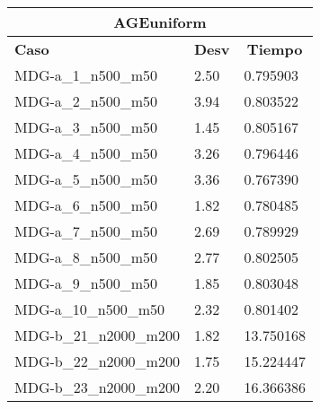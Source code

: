\documentclass[10pt,a4paper]{article}
\begin{document}
\begin{table}[]
	\centering
	\begin{tabular}{lll}
		\hline
		\multicolumn{3}{|c|}{\textbf{AGEuniform}}                                                                                \\ \hline
		\multicolumn{1}{|l|}{\textbf{Caso}}          & \multicolumn{1}{c|}{\textbf{Desv}} & \multicolumn{1}{c|}{\textbf{Tiempo}} \\ \hline
		\multicolumn{1}{|l|}{MDG-a\_1\_n500\_m50}    & \multicolumn{1}{l|}{2.50}          & \multicolumn{1}{l|}{0.795903}        \\ \hline
		\multicolumn{1}{|l|}{MDG-a\_2\_n500\_m50}    & \multicolumn{1}{l|}{3.94}          & \multicolumn{1}{l|}{0.803522}        \\ \hline
		\multicolumn{1}{|l|}{MDG-a\_3\_n500\_m50}    & \multicolumn{1}{l|}{1.45}          & \multicolumn{1}{l|}{0.805167}        \\ \hline
		\multicolumn{1}{|l|}{MDG-a\_4\_n500\_m50}    & \multicolumn{1}{l|}{3.26}          & \multicolumn{1}{l|}{0.796446}        \\ \hline
		\multicolumn{1}{|l|}{MDG-a\_5\_n500\_m50}    & \multicolumn{1}{l|}{3.36}          & \multicolumn{1}{l|}{0.767390}        \\ \hline
		\multicolumn{1}{|l|}{MDG-a\_6\_n500\_m50}    & \multicolumn{1}{l|}{1.82}          & \multicolumn{1}{l|}{0.780485}        \\ \hline
		\multicolumn{1}{|l|}{MDG-a\_7\_n500\_m50}    & \multicolumn{1}{l|}{2.69}          & \multicolumn{1}{l|}{0.789929}        \\ \hline
		\multicolumn{1}{|l|}{MDG-a\_8\_n500\_m50}    & \multicolumn{1}{l|}{2.77}          & \multicolumn{1}{l|}{0.802505}        \\ \hline
		\multicolumn{1}{|l|}{MDG-a\_9\_n500\_m50}    & \multicolumn{1}{l|}{1.85}          & \multicolumn{1}{l|}{0.803048}        \\ \hline
		\multicolumn{1}{|l|}{MDG-a\_10\_n500\_m50}   & \multicolumn{1}{l|}{2.32}          & \multicolumn{1}{l|}{0.801402}        \\ \hline
		\multicolumn{1}{|l|}{MDG-b\_21\_n2000\_m200} & \multicolumn{1}{l|}{1.82}          & \multicolumn{1}{l|}{13.750168}       \\ \hline
		\multicolumn{1}{|l|}{MDG-b\_22\_n2000\_m200} & \multicolumn{1}{l|}{1.75}          & \multicolumn{1}{l|}{15.224447}       \\ \hline
		\multicolumn{1}{|l|}{MDG-b\_23\_n2000\_m200} & \multicolumn{1}{l|}{2.20}          & \multicolumn{1}{l|}{16.366386}       \\ \hline

\end{tabular}
\end{table}
\end{document}
